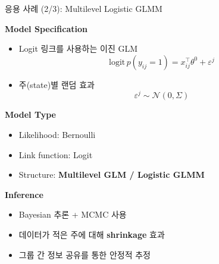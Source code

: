 \documentclass[xcolor=dvipsnames,t,9pt]{beamer}
\begin{document}
\begin{frame}{응용 사례 (2/3): Multilevel Logistic GLMM}

    \textbf{Model Specification}
    \begin{itemize}
        \item Logit 링크를 사용하는 이진 GLM
        \[
        \text{logit}\, p(y_{ij}=1)
        = x_{ij}^\top \theta^0 + \varepsilon^j
        \]
        \item 주(state)별 랜덤 효과
        \[
        \varepsilon^j \sim \mathcal{N}(0, \Sigma)
        \]
    \end{itemize}
    
    \medskip
    \textbf{Model Type}
    \begin{itemize}
        \item Likelihood: Bernoulli
        \item Link function: Logit
        \item Structure: \textbf{Multilevel GLM / Logistic GLMM}
    \end{itemize}
    
    \medskip
    \textbf{Inference}
    \begin{itemize}
        \item Bayesian 추론 + MCMC 사용
        \item 데이터가 적은 주에 대해 \textbf{shrinkage} 효과
        \item 그룹 간 정보 공유를 통한 안정적 추정
    \end{itemize}
    
\end{frame}

\end{document}
